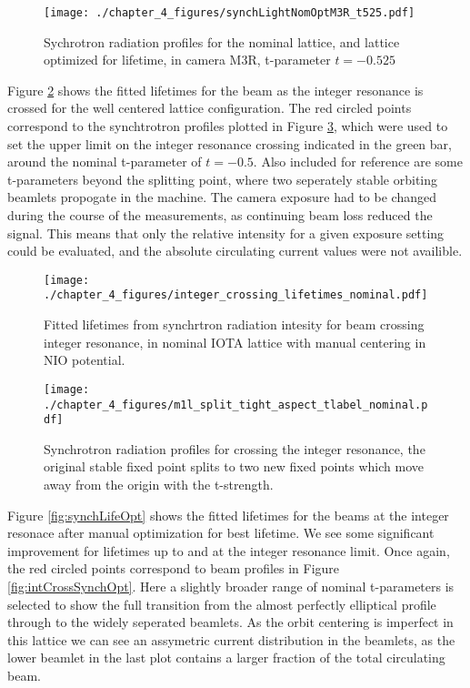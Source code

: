 \begin{figure}
	\centering
	\texttt{[image: ./chapter\_4\_figures/synchLightNomOptM3R\_t525.pdf]}
	\caption{Sychrotron radiation profiles for the nominal lattice, and lattice optimized for lifetime, in camera M3R, t-parameter $t=-0.525$}
	\label{fig:synchCenter}
\end{figure}

Figure \ref{fig:synchLifeNom} shows the fitted lifetimes for the beam as the integer resonance is crossed for the well centered lattice configuration. The red circled points correspond to the synchtrotron profiles plotted in Figure \ref{fig:intCrossSynchNom}, which were used to set the upper limit on the integer resonance crossing indicated in the green bar, around the nominal t-parameter of $t=-0.5$. Also included for reference are some t-parameters beyond the splitting point, where two seperately stable orbiting beamlets propogate in the machine. The camera exposure had to be changed during the course of the measurements, as continuing beam loss reduced the signal. This means that only the relative intensity for a given exposure setting could be evaluated, and the absolute circulating current values were not availible.

\begin{figure}
	\centering
	\texttt{[image: ./chapter\_4\_figures/integer\_crossing\_lifetimes\_nominal.pdf]}
	\caption{Fitted lifetimes from synchrtron radiation intesity for beam crossing integer resonance, in nominal IOTA lattice with manual centering in NIO potential.}
	\label{fig:synchLifeNom}
\end{figure}

\begin{figure}
	\centering
	\texttt{[image: ./chapter\_4\_figures/m1l\_split\_tight\_aspect\_tlabel\_nominal.pdf]}
	\caption{Synchrotron radiation profiles for crossing the integer resonance, the original stable fixed point splits to two new fixed points which move away from the origin with the t-strength.}
	\label{fig:intCrossSynchNom}
\end{figure}

Figure \ref{fig:synchLifeOpt} shows the fitted lifetimes for the beams at the integer resonace after manual optimization for best lifetime. We see some significant improvement for lifetimes up to and at the integer resonance limit. Once again, the red circled points correspond to beam profiles in Figure \ref{fig:intCrossSynchOpt}. Here a slightly broader range of nominal t-parameters is selected to show the full transition from the almost perfectly elliptical profile through to the widely seperated beamlets. As the orbit centering is imperfect in this lattice we can see an assymetric current distribution in the beamlets, as the lower beamlet in the last plot contains a larger fraction of the total circulating beam.

